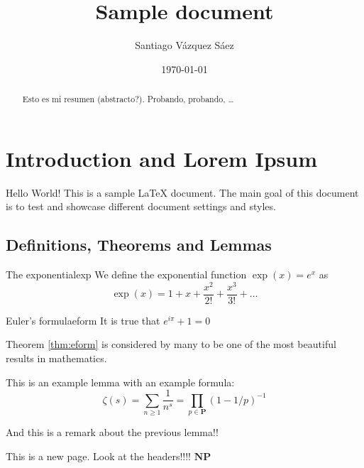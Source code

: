 \documentclass[twoside]{article}
\renewcommand{\mathbb}[1]{\mathbf{#1}} %
\newcommand{\N}{\mathbb N}
\renewcommand{\P}{\mathbb P}
\begin{document}
\title{Sample document}
\author{Santiago Vázquez Sáez}
\date{\today}
\maketitle

\begin{abstract}
	Esto es mi resumen (abstracto?). Probando, probando, \ldots
\end{abstract}

\tableofcontents

\section{Introduction and Lorem Ipsum}

Hello World!
This is a sample {\LaTeX} document. The main goal of this document is to test and showcase different document settings and styles.

\blindtext

\subsection{Definitions, Theorems and Lemmas}
\begin{definition}{The exponential}{exp}
	We define the exponential function $\exp (x)=e^x$ as
	\[
		\exp(x) = 1+x+\frac{x^2}{2!}+\frac{x^3}{3!}+\dots
	\]
\end{definition}
\begin{theorem}{Euler's formula}{eform}
	It is true that $e^{i\pi}+1=0$
\end{theorem}
Theorem \ref{thm:eform} is considered by many to be one of the most beautiful results in mathematics.

\begin{lemma}{}{}
	This is an example lemma with an example formula:
	\[
		\zeta(s) = \sum_{n\geq 1} \frac{1}{n^s}=\prod_{p \in \P}\left(1-1/p  \right)^{-1}
	\]

\end{lemma}
\begin{remark}{}{}
And this is a remark about the previous lemma!!
\end{remark}

\newpage
This is a new page. Look at the headers!!!!
$\N \P$
\end{document}
